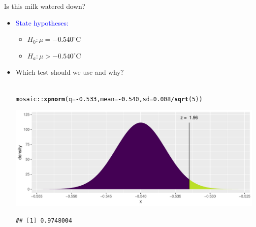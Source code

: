 \documentclass[handout]{beamer}\usepackage[]{graphicx}\usepackage[]{color}
\newcommand{\hlnum}[1]{\textcolor[rgb]{0.686,0.059,0.569}{#1}}%
\newcommand{\hlopt}[1]{\textcolor[rgb]{0,0,0}{#1}}%
\newcommand{\hlstd}[1]{\textcolor[rgb]{0.345,0.345,0.345}{#1}}%
\newcommand{\hlkwc}[1]{\textcolor[rgb]{0.333,0.667,0.333}{#1}}%
\newcommand{\hlkwd}[1]{\textcolor[rgb]{0.737,0.353,0.396}{\textbf{#1}}}%
\newenvironment{knitrout}{}{} %
\newcommand{\blue}[1]{\textcolor{blue}{#1}}
\begin{document}
\begin{frame}[fragile]{Is this milk watered down?}
	\begin{itemize}
		\setlength\itemsep{.7em}
		\item \blue{State hypotheses:} \pause \begin{itemize}
			\item $H_0: \mu =  -0.540^{\circ}$C \pause
			\item  $H_a: \mu >  -0.540^{\circ}$C
		\end{itemize}
		\item Which test should we use and why? \pause \\ \ \\

		
\begin{knitrout}\scriptsize
{}\color{fgcolor}
\begin{alltt}
\hlstd{mosaic}\hlopt{::}\hlkwd{xpnorm}\hlstd{(}\hlkwc{q} \hlstd{=} \hlopt{-}\hlnum{0.533}\hlstd{,} \hlkwc{mean} \hlstd{=} \hlopt{-}\hlnum{0.540}\hlstd{,} \hlkwc{sd} \hlstd{=} \hlnum{0.008}\hlopt{/}\hlkwd{sqrt}\hlstd{(}\hlnum{5}\hlstd{))}
\end{alltt}


{\ttfamily\noindent\itshape\color{messagecolor}{\#\# }}

{\ttfamily\noindent\itshape{}}

{\ttfamily\noindent\itshape\color{messagecolor}{\#\# 	P(X <= -0.533) = P(Z <= 1.957) = 0.9748}}

{\ttfamily\noindent\itshape\color{messagecolor}{\#\# 	P(X >\ \ -0.533) = P(Z >\ \ 1.957) = 0.0252}}

{\ttfamily\noindent\itshape\color{messagecolor}{\#\# }}

{\centering \includegraphics[width=1\linewidth]{figure/unnamed-chunk-1-1} 

}


\begin{verbatim}
## [1] 0.9748004
\end{verbatim}

\end{knitrout}

\end{itemize}
\end{frame}
\end{document}
